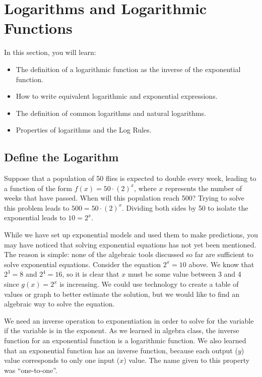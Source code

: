 \section{Logarithms and Logarithmic Functions}

In this section, you will learn:

\begin{itemize}
    \item The definition of a logarithmic function as the inverse of the exponential function.
    \item How to write equivalent logarithmic and exponential expressions.
    \item The definition of common logarithms and natural logarithms.
    \item Properties of logarithms and the Log Rules.
\end{itemize}

\subsection{Define the Logarithm}
Suppose that a population of 50 flies is expected to double every week, leading to a function of the form \( f(x) = 50 \cdot (2)^x \), where \( x \) represents the number of weeks that have passed. When will this population reach 500? Trying to solve this problem leads to \( 500 = 50 \cdot (2)^x \). Dividing both sides by 50 to isolate the exponential leads to \( 10 = 2^x \).

While we have set up exponential models and used them to make predictions, you may have noticed that solving exponential equations has not yet been mentioned. The reason is simple: none of the algebraic tools discussed so far are sufficient to solve exponential equations. Consider the equation \( 2^x = 10 \) above. We know that \( 2^3 = 8 \) and \( 2^4 = 16 \), so it is clear that \( x \) must be some value between 3 and 4 since \( g(x) = 2^x \) is increasing. We could use technology to create a table of values or graph to better estimate the solution, but we would like to find an algebraic way to solve the equation.

We need an inverse operation to exponentiation in order to solve for the variable if the variable is in the exponent. As we learned in algebra class, the inverse function for an exponential function is a logarithmic function. We also learned that an exponential function has an inverse function, because each output ($y$) value corresponds to only one input ($x$) value. The name given to this property was “one-to-one”.

